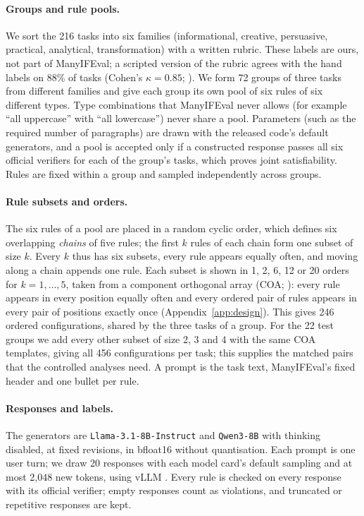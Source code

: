 \documentclass{article}
\begin{document}
\paragraph{Groups and rule pools.} We sort the 216 tasks into six families (informational, creative, persuasive,
practical, analytical, transformation) with a written rubric. These labels are ours, not part of ManyIFEval; a
scripted version of the rubric agrees with the hand labels on 88\% of tasks (Cohen's $\kappa=0.85$;
\citealp{landis1977kappa}). We form 72 groups of three tasks from different families and give each group its own
pool of six rules of six different types. Type combinations that ManyIFEval never allows (for example ``all
uppercase'' with ``all lowercase'') never share a pool. Parameters (such as the required number of paragraphs) are
drawn with the released code's default generators, and a pool is accepted only if a constructed response passes all
six official verifiers for each of the group's tasks, which proves joint satisfiability. Rules are fixed within a
group and sampled independently across groups.

\paragraph{Rule subsets and orders.} The six rules of a pool are placed in a random cyclic order, which defines six
overlapping \emph{chains} of five rules; the first $k$ rules of each chain form one subset of size $k$. Every $k$ thus
has six subsets, every rule appears equally often, and moving along a chain appends one rule. Each subset is shown
in 1, 2, 6, 12 or 20 orders for $k=1,\dots,5$, taken from a component orthogonal array (COA; \citealp{yang2021coa}):
every rule appears in every position equally often and every ordered pair of rules appears in every pair of positions
exactly once (Appendix~\ref{app:design}). This gives 246 ordered configurations, shared by the three tasks of a group.
For the 22 test groups we add every other subset of size 2, 3 and 4 with the same COA templates, giving all 456
configurations per task; this supplies the matched pairs that the controlled analyses need. A prompt is the task
text, ManyIFEval's fixed header and one bullet per rule.

\paragraph{Responses and labels.} The generators are \texttt{Llama-3.1-8B-Instruct} \citep{grattafiori2024llama3} and
\texttt{Qwen3-8B} \citep{yang2025qwen3} with thinking disabled, at fixed revisions, in bfloat16 without quantisation.
Each prompt is one user turn; we draw 20 responses with each model card's default sampling and at most 2,048 new
tokens, using vLLM \citep{kwon2023vllm}. Every rule is checked on
every response with its official verifier; empty responses count as violations, and truncated or repetitive responses
are kept.
\end{document}
